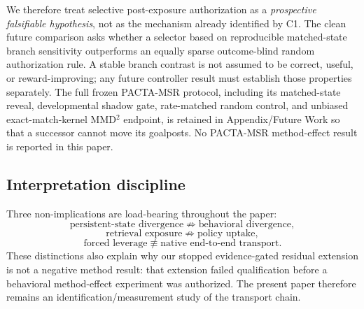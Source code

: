 We therefore treat selective post-exposure authorization as a \emph{prospective falsifiable hypothesis}, not as the mechanism already identified by C1. The clean future comparison asks whether a selector based on reproducible matched-state branch sensitivity outperforms an equally sparse outcome-blind random authorization rule. A stable branch contrast is not assumed to be correct, useful, or reward-improving; any future controller result must establish those properties separately. The full frozen PACTA-MSR protocol, including its matched-state reveal, developmental shadow gate, rate-matched random control, and unbiased exact-match-kernel MMD$^2$ endpoint, is retained in Appendix/Future Work so that a successor cannot move its goalposts. No PACTA-MSR method-effect result is reported in this paper.

\subsection{Interpretation discipline}
Three non-implications are load-bearing throughout the paper:
\[
  \text{persistent-state divergence}\not\Rightarrow\text{behavioral divergence},
\]
\[
  \text{retrieval exposure}\not\Rightarrow\text{policy uptake},
\]
\[
  \text{forced leverage}\not\equiv\text{native end-to-end transport}.
\]
These distinctions also explain why our stopped evidence-gated residual extension is not a negative method result: that extension failed qualification before a behavioral method-effect experiment was authorized. The present paper therefore remains an identification/measurement study of the transport chain.
